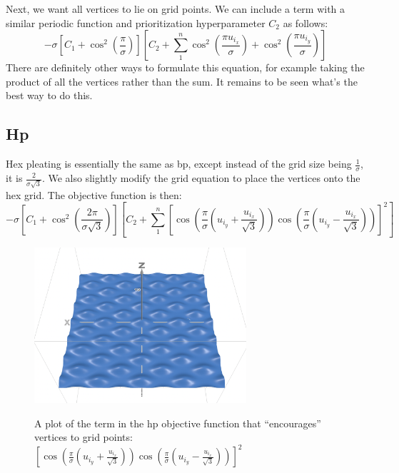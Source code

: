\documentclass[12pt]{article}
\begin{document}
Next, we want all vertices to lie on grid points. We can include a term with a similar periodic function and prioritization hyperparameter $C_2$ as follows: 
\begin{equation}\label{eq:bp obj}
    -\sigma \left[C_1+\cos^2(\frac{\pi}{\sigma})\right]
    \left[C_2+\sum_{1}^{n}\cos^2(\frac{\pi u_{i_x}}{\sigma}) + \cos^2(\frac{\pi u_{i_y}}{\sigma})\right]
\end{equation}
There are definitely other ways to formulate this equation, for example taking the product of all the vertices rather than the sum. It remains to be seen what's the best way to do this.

\subsection{Hp}
Hex pleating is essentially the same as bp, except instead of the grid size being $\frac{1}{\sigma}$, it is $\frac{2}{\sigma \sqrt{3}}$. We also slightly modify the grid equation to place the vertices onto the hex grid. The objective function is then:
\begin{equation}\label{eq:hp obj}
    -\sigma \left[C_1+\cos^2(\frac{2\pi}{\sigma\sqrt{3}})\right]
    \left[C_2+\sum_{1}^{n}\left[\cos(
        \frac{\pi}{\sigma}(u_{i_y}+\frac{u_{i_x}}{\sqrt{3}})
    ) \cos(
        \frac{\pi}{\sigma}(u_{i_y}-\frac{u_{i_x}}{\sqrt{3}})
    )\right]^2\right]
\end{equation}
\begin{figure}[h]
    \centering
    \includegraphics[width=0.7\textwidth]{hex grid.png}\label{fig:hex grid}\caption{A plot of the term in the hp objective function that ``encourages'' vertices to grid points: $\left[\cos(
        \frac{\pi}{\sigma}(u_{i_y}+\frac{u_{i_x}}{\sqrt{3}})
    ) \cos(
        \frac{\pi}{\sigma}(u_{i_y}-\frac{u_{i_x}}{\sqrt{3}})
    )\right]^2$}
\end{figure}
\end{document}
